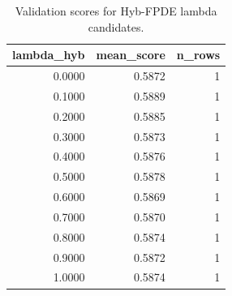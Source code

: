 \begin{table}[t]
\caption{Validation scores for Hyb-FPDE lambda candidates.}
\label{tab:lambda_distribution_computed}
\centering
\begin{tabular}{rrr}
\toprule
lambda\_hyb & mean\_score & n\_rows \\
\midrule
0.0000 & 0.5872 & 1 \\
0.1000 & 0.5889 & 1 \\
0.2000 & 0.5885 & 1 \\
0.3000 & 0.5873 & 1 \\
0.4000 & 0.5876 & 1 \\
0.5000 & 0.5878 & 1 \\
0.6000 & 0.5869 & 1 \\
0.7000 & 0.5870 & 1 \\
0.8000 & 0.5874 & 1 \\
0.9000 & 0.5872 & 1 \\
1.0000 & 0.5874 & 1 \\
\bottomrule
\end{tabular}

\end{table}
